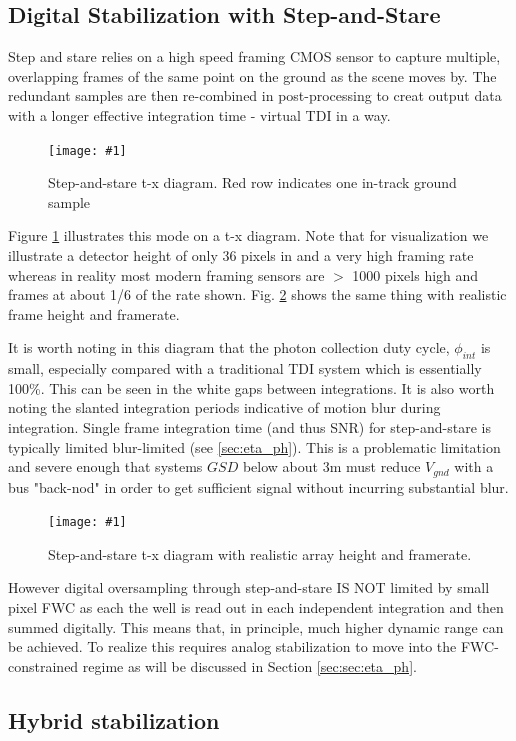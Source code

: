 \documentclass[10pt,journal]{IEEEtran}  %
\newcommand{\includefigure}[3]
{
  \begin{figure}[h!]
  \centering
  \texttt{[image: \#1]}
  \caption[]{#3}
  \label{#2}
  \end{figure}
}
\begin{document}
\subsection{Digital Stabilization with Step-and-Stare}
Step and stare relies on a high speed framing CMOS sensor to capture multiple, overlapping frames of the same point on the ground as the scene moves by.  The redundant samples are then re-combined in post-processing to creat output data with a longer effective integration time - virtual TDI in a way.

\includefigure{figures/step_stare.pgf}{fig:step_stare}{Step-and-stare t-x diagram.  Red row indicates one in-track ground sample}

Figure \ref{fig:step_stare} illustrates this mode on a t-x diagram.  Note that for visualization we illustrate a detector height of only 36 pixels in and a very high framing rate whereas in reality most modern framing sensors are $>$ 1000 pixels high and frames at about 1/6 of the rate shown.  Fig. \ref{fig:step_stare_real} shows the same thing with realistic frame height and framerate.

It is worth noting in this diagram that the photon collection duty cycle, $\phi_{int}$ is small, especially compared with a traditional TDI system which is essentially 100\%.  This can be seen in the white gaps between integrations.  It is also worth noting the slanted integration periods indicative of motion blur during integration.  Single frame integration time (and thus SNR) for step-and-stare is typically limited blur-limited (see \ref{sec:eta_ph}).  This is a problematic limitation and severe enough that systems $GSD$ below about 3m must reduce $V_{gnd}$ with a bus "back-nod" in order to get sufficient signal without incurring substantial blur.

\includefigure{figures/step_stare_real.pgf}{fig:step_stare_real}{Step-and-stare t-x diagram with realistic array height and framerate.}

However digital oversampling through step-and-stare IS NOT limited by small pixel FWC as each the well is read out in each independent integration and then summed digitally.  This means that, in principle, much higher dynamic range can be achieved.  To realize this requires analog stabilization to move into the FWC-constrained regime as will be discussed in Section \ref{sec:sec:eta_ph}.


\subsection{Hybrid stabilization}
\end{document}
